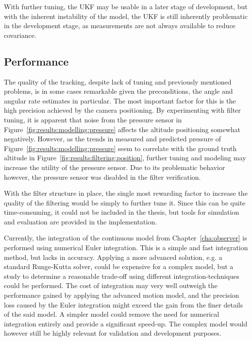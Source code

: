             With further tuning, the UKF may be usable in a later stage of development, but with the inherent
            instability of the model, the UKF is still inherently problematic in
            the development stage, as measurements are not always
            available to reduce covariance.

        \subsection{Performance}
            The quality of the tracking, despite lack of tuning and previously
            mentioned problems, is in some cases remarkable given the
            preconditions, the angle and angular rate estimates in particular.
            The most important factor for this is the high precision achieved by the
            camera positioning. By experimenting with filter tuning, it
            is apparent that noise from the pressure sensor
            in Figure~\ref{fig:results:modelling:pressure} affects the altitude positioning
            somewhat negatively. However, as the trends in measured and predicted pressure of Figure~\ref{fig:results:modelling:pressure}
            seem to correlate with the ground truth altitude in Figure~\ref{fig:results:filtering:position},
            further tuning and modeling may increase the utility of the pressure sensor.
            Due to its problematic behavior however, the pressure sensor was
            disabled in the filter verification.

            With the filter structure in place, the single
            most rewarding factor to increase the quality of the filtering
            would be simply to further tune it. Since this can be quite time-consuming,
            it could not be included in the thesis, but tools for simulation
            and evaluation are provided in the implementation.

            Currently, the integration of the continuous model from Chapter~\ref{cha:observer}
            is performed using numerical Euler integration.
            This is a simple and fast integration method, but lacks in accuracy.
            Applying a more advanced solution, e.g. a standard Runge-Kutta solver,
            could be expensive for a complex model, but a study to determine
            a reasonable trade-off using different integration-techniques could be performed.
            The cost of integration may very well outweigh
            the performance gained by applying the advanced motion model,
            and the precision loss caused by the Euler integration might
            exceed the gain from the finer details of the said model.
            A simpler model could remove the need for numerical integration
            entirely and provide a significant speed-up. The complex model
            would however still be highly relevant for validation and
            development purposes.

